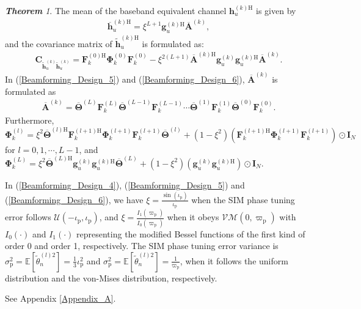 \documentclass[lettersize,journal]{IEEEtran}
\theoremstyle{remark}
\newtheorem{theorem}{\quad \textbf{Theorem}}
\begin{document}
\begin{theorem}\label{Theorem_1}
    The mean of the baseband equivalent channel $\mathbf{h}_u^{(k)\mathrm{H}}$ is given by
    \begin{align}\label{Beamforming_Design_5}
        \overline{\mathbf{h}}_u^{(k)\mathrm{H}}
        =\xi^{L+1}\mathbf{g}_u^{(k)\mathrm{H}}\overline{\mathbf{A}}^{(k)},
    \end{align}
    and the covariance matrix of $\widetilde{\mathbf{h}}_u^{(k)\mathrm{H}}$ is formulated as:
    \begin{align}\label{Beamforming_Design_6}
        \mathbf{C}_{\widetilde{\mathbf{h}}_u^{(k)}\widetilde{\mathbf{h}}_u^{(k)}}
        =\mathbf{F}_k^{(0)\mathrm{H}}\mathbf{\Phi}_k^{(0)}\mathbf{F}_k^{(0)}
        -\xi^{2(L+1)}\overline{\mathbf{A}}^{(k)\mathrm{H}}\mathbf{g}_u^{(k)}
        \mathbf{g}_u^{(k)\mathrm{H}}\overline{\mathbf{A}}^{(k)}.
    \end{align}
    In (\ref{Beamforming_Design_5}) and (\ref{Beamforming_Design_6}), $\overline{\mathbf{A}}^{(k)}$ is formulated as
    \begin{align}\label{System_Model_6_2}
        \overline{\mathbf{A}}^{(k)}=\overline{\mathbf{\Theta}}^{(L)}\mathbf{F}_k^{(L)}
        \overline{\mathbf{\Theta}}^{(L-1)}\mathbf{F}_k^{(L-1)}\cdots
        \overline{\mathbf{\Theta}}^{(1)}\mathbf{F}_k^{(1)}
        \overline{\mathbf{\Theta}}^{(0)}\mathbf{F}_k^{(0)}.
    \end{align}
    Furthermore, $\mathbf{\Phi}_k^{(l)}=\xi^2\overline{\mathbf{\Theta}}^{(l)\mathrm{H}}
    \mathbf{F}_k^{(l+1)\mathrm{H}}\mathbf{\Phi}_k^{(l+1)}\mathbf{F}_k^{(l+1)}
    \overline{\mathbf{\Theta}}^{(l)}+(1-\xi^2)(\mathbf{F}_k^{(l+1)\mathrm{H}}
    \mathbf{\Phi}_k^{(l+1)}\mathbf{F}_k^{(l+1)})\odot\mathbf{I}_N$ for $l=0,1,\cdots,L-1$, and $\mathbf{\Phi}_k^{(L)}=\xi^2\overline{\mathbf{\Theta}}^{(L)\mathrm{H}}
    \mathbf{g}_u^{(k)}\mathbf{g}_u^{(k)\mathrm{H}}\overline{\mathbf{\Theta}}^{(L)}
    +(1-\xi^2)(\mathbf{g}_u^{(k)}\mathbf{g}_u^{(k)\mathrm{H}})\odot\mathbf{I}_N$.

    In (\ref{Beamforming_Design_4}), (\ref{Beamforming_Design_5}) and (\ref{Beamforming_Design_6}), we have $\xi=\frac{\sin(\iota_\mathrm{p})}{\iota_\mathrm{p}}$ when the SIM phase tuning error follows $\mathcal{U}(-\iota_\mathrm{p},\iota_\mathrm{p})$, and $\xi=\frac{I_1(\varpi_\text{p})}{I_0(\varpi_\mathrm{p})}$ when it obeys $\mathcal{VM}(0,\varpi_\text{p})$ with $I_0(\cdot)$ and $I_1(\cdot)$ representing the modified Bessel functions of the first kind of order 0 and order 1, respectively. The SIM phase tuning error variance is $\sigma_\mathrm{p}^2=
    \mathbb{E}[\widetilde{\theta}_n^{(l)2}]=\frac{1}{3}\iota_\mathrm{p}^2$ and $\sigma_\mathrm{p}^2=\mathbb{E}[\widetilde{\theta}_n^{(l)2}]=\frac{1}{\varpi_\text{p}}$, when it follows the uniform distribution and the von-Mises distribution, respectively.
\end{theorem}
\begin{IEEEproof}
    See Appendix \ref{Appendix_A}.
\end{IEEEproof}
\end{document}
